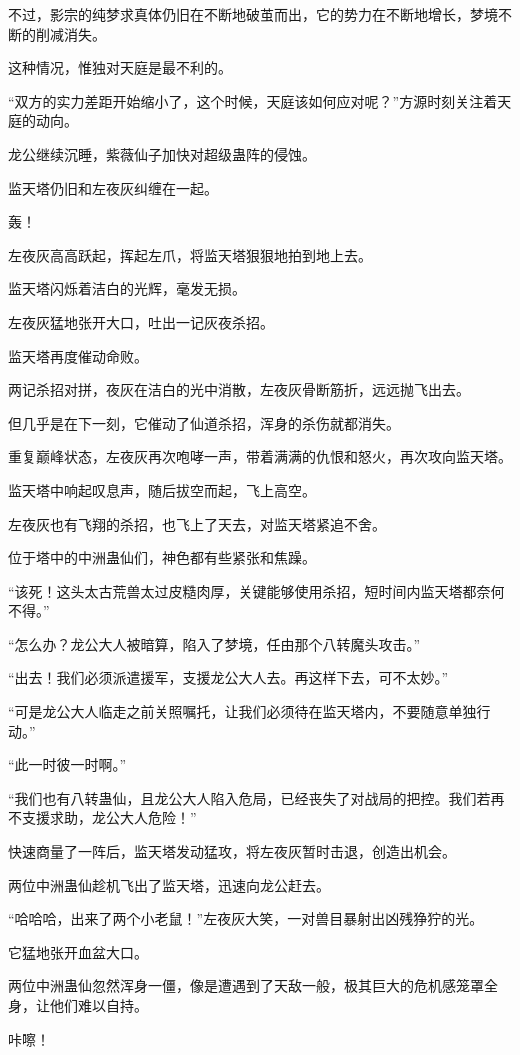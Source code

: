 \begin{this_body}
不过，影宗的纯梦求真体仍旧在不断地破茧而出，它的势力在不断地增长，梦境不断的削减消失。

这种情况，惟独对天庭是最不利的。

“双方的实力差距开始缩小了，这个时候，天庭该如何应对呢？”方源时刻关注着天庭的动向。

龙公继续沉睡，紫薇仙子加快对超级蛊阵的侵蚀。

监天塔仍旧和左夜灰纠缠在一起。

轰！

左夜灰高高跃起，挥起左爪，将监天塔狠狠地拍到地上去。

监天塔闪烁着洁白的光辉，毫发无损。

左夜灰猛地张开大口，吐出一记灰夜杀招。

监天塔再度催动命败。

两记杀招对拼，夜灰在洁白的光中消散，左夜灰骨断筋折，远远抛飞出去。

但几乎是在下一刻，它催动了仙道杀招，浑身的杀伤就都消失。

重复巅峰状态，左夜灰再次咆哮一声，带着满满的仇恨和怒火，再次攻向监天塔。

监天塔中响起叹息声，随后拔空而起，飞上高空。

左夜灰也有飞翔的杀招，也飞上了天去，对监天塔紧追不舍。

位于塔中的中洲蛊仙们，神色都有些紧张和焦躁。

“该死！这头太古荒兽太过皮糙肉厚，关键能够使用杀招，短时间内监天塔都奈何不得。”

“怎么办？龙公大人被暗算，陷入了梦境，任由那个八转魔头攻击。”

“出去！我们必须派遣援军，支援龙公大人去。再这样下去，可不太妙。”

“可是龙公大人临走之前关照嘱托，让我们必须待在监天塔内，不要随意单独行动。”

“此一时彼一时啊。”

“我们也有八转蛊仙，且龙公大人陷入危局，已经丧失了对战局的把控。我们若再不支援求助，龙公大人危险！”

快速商量了一阵后，监天塔发动猛攻，将左夜灰暂时击退，创造出机会。

两位中洲蛊仙趁机飞出了监天塔，迅速向龙公赶去。

“哈哈哈，出来了两个小老鼠！”左夜灰大笑，一对兽目暴射出凶残狰狞的光。

它猛地张开血盆大口。

两位中洲蛊仙忽然浑身一僵，像是遭遇到了天敌一般，极其巨大的危机感笼罩全身，让他们难以自持。

咔嚓！


\end{this_body}

